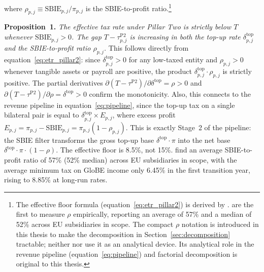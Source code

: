 \documentclass[11pt,a4paper]{article}
\begin{document}
where $\rho_{p,j} \equiv \text{SBIE}_{p,j} / \pi_{p,j}$ is the SBIE-to-profit ratio.\footnote{The effective floor formula (equation~\eqref{eq:etr_pillar2}) is derived by \citet{schjelderup2024}. \citet{devereux2023} are the first to measure $\rho$ empirically, reporting an average of 57\% and a median of 52\% across EU subsidiaries in scope. The compact $\rho$ notation is introduced in this thesis to make the decomposition in Section~\ref{sec:decomposition} tractable; neither \citet{schjelderup2024} nor \citet{devereux2023} use it as an analytical device. Its analytical role in the revenue pipeline (equation~\eqref{eq:pipeline}) and factorial decomposition is original to this thesis.}

\textbf{Proposition~1.} \emph{The effective tax rate under Pillar Two is strictly below $T$ whenever $\text{SBIE}_{p,j} > 0$. The gap $T - \tau_{p,j}^{\text{P2}}$ is increasing in both the top-up rate $\delta_{p,j}^{\text{top}}$ and the SBIE-to-profit ratio $\rho_{p,j}$.} This follows directly from equation~\eqref{eq:etr_pillar2}: since $\delta_{p,j}^{\text{top}} > 0$ for any low-taxed entity and $\rho_{p,j} > 0$ whenever tangible assets or payroll are positive, the product $\delta_{p,j}^{\text{top}} \cdot \rho_{p,j}$ is strictly positive. The partial derivatives $\partial(T - \tau^{\text{P2}})/\partial \delta^{\text{top}} = \rho > 0$ and $\partial(T - \tau^{\text{P2}})/\partial \rho = \delta^{\text{top}} > 0$ confirm the monotonicity. Also, this connects to the revenue pipeline in equation~\eqref{eq:pipeline}, since the top-up tax on a single bilateral pair is equal to $\delta_{p,j}^{\text{top}} \times E_{p,j}$, where excess profit $E_{p,j} = \pi_{p,j} - \text{SBIE}_{p,j} = \pi_{p,j}(1 - \rho_{p,j})$. This is exactly Stage~2 of the pipeline: the SBIE filter transforms the gross top-up base $\delta^{\text{top}} \cdot \pi$ into the net base $\delta^{\text{top}} \cdot \pi \cdot (1 - \rho)$. The effective floor is 8.5\%, not 15\%. \citet{devereux2023} find an average SBIE-to-profit ratio of 57\% (52\% median) across EU subsidiaries in scope, with the average minimum tax on GloBE income only 6.45\% in the first transition year, rising to 8.85\% at long-run rates.
\end{document}
